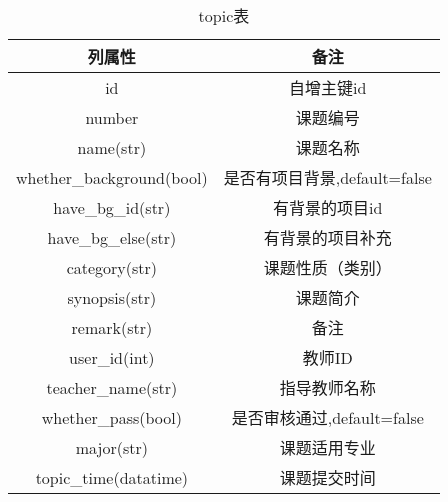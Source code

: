 \begin{table}[ht]
    \centering
    \caption{topic表}
    \begin{tabular}{|c|c|}
        \hline
        列属性                       & 备注                    \\
        \hline
        id                        & 自增主键id                \\
        \hline
        number                    & 课题编号                  \\
        \hline
        name(str)                 & 课题名称                  \\
        \hline
        whether\_background(bool) & 是否有项目背景,default=false \\
        \hline
        have\_bg\_id(str)         & 有背景的项目id              \\
        \hline
        have\_bg\_else(str)       & 有背景的项目补充              \\
        \hline
        category(str)             & 课题性质（类别）              \\
        \hline
        synopsis(str)             & 课题简介                  \\
        \hline
        remark(str)               & 备注                    \\
        \hline
        user\_id(int)             & 教师ID                  \\
        \hline
        teacher\_name(str)        & 指导教师名称                \\
        \hline
        whether\_pass(bool)       & 是否审核通过,default=false  \\
        \hline
        major(str)                & 课题适用专业                \\
        \hline
        topic\_time(datatime)     & 课题提交时间                \\
        \hline
    \end{tabular}
   
    \label{tab:topic}
\end{table}

\clearpage

